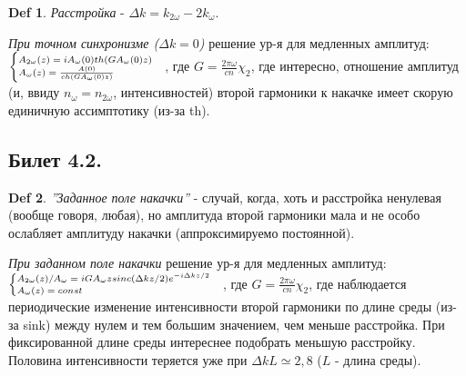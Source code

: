 \documentclass[a4paper,12pt]{article}
\theoremstyle{definition} %
\theoremstyle{definition} %
\newtheorem{Def}{Def}[section]
\theoremstyle{remark} %
\begin{document}
\begin{Def}
	\textit{Расстройка} - $\Delta k = k_{2\omega}-2k_{\omega}$.
\end{Def}

	\textit{При точном синхронизме ($\Delta k = 0$)} решение ур-я для медленных амплитуд: \\$\scriptsize
	\begin{cases}
		A_{2\omega}(z)=iA_{\omega}(0)th(GA_{\omega}(0)z) \\
		A_{\omega}(z)=\frac{A(0)}{ch(GA_{\omega}(0)z)}
	\end{cases}$, где $G=\frac{2\pi \omega}{cn}\chi_{2}$, где интересно, отношение амплитуд (и, ввиду $n_{\omega}=n_{2\omega}$, интенсивностей) второй гармоники к накачке имеет скорую единичную ассимптотику (из-за th).

	
\subsection{Билет 4.2.}

\begin{Def}
	\textit{''Заданное поле накачки''} - случай, когда, хоть и расстройка ненулевая (вообще говоря, любая), но амплитуда второй гармоники мала и не особо ослабляет амплитуду накачки (аппроксимируемо постоянной).
\end{Def}

	\textit{При заданном поле накачки} решение ур-я для медленных амплитуд: \\$\scriptsize
	\begin{cases}
		A_{2\omega}(z)/A_{\omega}=iGA_{\omega}z sinc(\Delta k z/2) e^{-i\Delta k z/2} \\
		A_{\omega}(z)=const
	\end{cases}$, где $G=\frac{2\pi \omega}{cn}\chi_{2}$, где наблюдается периодические изменение интенсивности второй гармоники по длине среды (из-за sink) между нулем и тем большим значением, чем меньше расстройка. При фиксированной длине среды интереснее подобрать меньшую расстройку. Половина интенсивности теряется уже при $\Delta k L \simeq 2,8$ ($L$ - длина среды).
\end{document}
